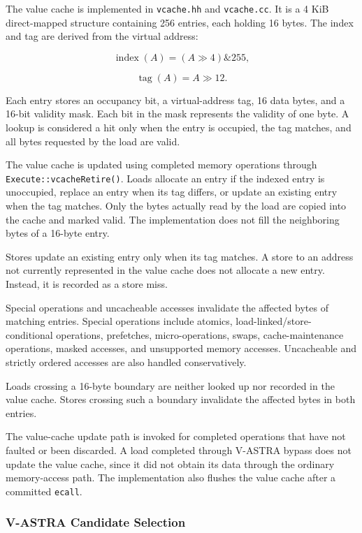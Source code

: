 The value cache is implemented in \texttt{vcache.hh} and
\texttt{vcache.cc}. It is a 4 KiB direct-mapped structure containing
256 entries, each holding 16 bytes. The index and tag are derived
from the virtual address:

\[
    \operatorname{index}(A) =
    (A \gg 4) \mathbin{\&} 255,
\]

\[
    \operatorname{tag}(A) = A \gg 12.
\]

Each entry stores an occupancy bit, a virtual-address tag,
16 data bytes, and a 16-bit validity mask. Each bit in the
mask represents the validity of one byte. A lookup is considered
a hit only when the entry is occupied, the tag matches, and
all bytes requested by the load are valid.

The value cache is updated using completed memory operations through
\texttt{Execute::vcacheRetire()}. Loads allocate an entry if
the indexed entry is unoccupied, replace an entry when its tag
differs, or update an existing entry when the tag matches.
Only the bytes actually read by the load are copied into the
cache and marked valid. The implementation does not fill the
neighboring bytes of a 16-byte entry.

Stores update an existing entry only when its tag matches.
A store to an address not currently represented in the value cache does
not allocate a new entry. Instead, it is recorded as a store miss.

Special operations and uncacheable accesses invalidate the
affected bytes of matching entries. Special operations include
atomics, load-linked/store-conditional operations, prefetches,
micro-operations, swaps, cache-maintenance operations, masked
accesses, and unsupported memory accesses. Uncacheable and
strictly ordered accesses are also handled conservatively.

Loads crossing a 16-byte boundary are neither looked up nor
recorded in the value cache. Stores crossing such a boundary invalidate
the affected bytes in both entries.

The value-cache update path is invoked for completed operations that
have not faulted or been discarded. A load completed through
V-ASTRA bypass does not update the value cache, since it did not obtain
its data through the ordinary memory-access path. The implementation also flushes the value cache after a committed
\texttt{ecall}.

\subsubsection{V-ASTRA Candidate Selection}

